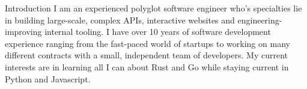 \documentclass{bluefin_cv}
\begin{document}
\makeheader

\begin{bfcvSection}{Introduction}
I am an experienced polyglot software engineer who’s specialties lie in building large-scale, complex APIs,
interactive websites and engineering-improving internal tooling. I have over 10 years of software development
experience ranging from the fast-paced world of startups to working on many different contracts with a small,
independent team of developers. My current interests are in learning all I can about Rust and Go while staying
current in Python and Javascript.
\end{bfcvSection}
\end{document}
